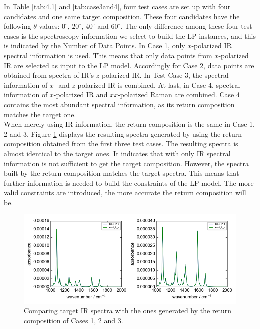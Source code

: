 In Table \ref{tab:4.1} and \ref{tab:case3and4}, four test cases are set up with four candidates and one same target composition. These four candidates have the following $\theta$ values: $0^{\circ}$, $20^{\circ}$, $40^{\circ}$ and $60^{\circ}$. The only difference among these four test cases is the spectroscopy information we select to build the LP instances, and this is indicated by the Number of Data Points. In Case 1, only $x$-polarized IR spectral information is used. This means that only data points from $x$-polarized IR are selected as input to the LP model. Accordingly for Case 2, data points are obtained from spectra of IR's $z$-polarized IR. In Test Case 3, the spectral information of $x$- and $z$-polarized IR is combined. At last, in Case 4, spectral information of $x$-polarized IR and $xx$-polarized Raman are combined. Case 4 contains the most abundant spectral information, as its return composition matches the target one. \\

When merely using IR information, the return composition is the same in Case 1, 2 and 3. Figure \ref{fig:4.1} displays the resulting spectra generated by using the return composition obtained from the first three test cases. The resulting spectra is almost identical to the target ones. It indicates that with only IR spectral information is not sufficient to get the target composition.  However, the spectra built by the return composition matches the target spectra. This means that further information is needed to build the constraints of the LP model. The more valid constraints are introduced, the more accurate the return composition will be. \\

\begin{figure}[!ht]
\centering
\includegraphics[scale=0.7]{Figures/ir_xz_result_plotting_remove_space.png}
\caption{Comparing target IR spectra with the ones generated by the return composition of Cases 1, 2 and 3.}  \label{fig:4.1}
\end{figure}

